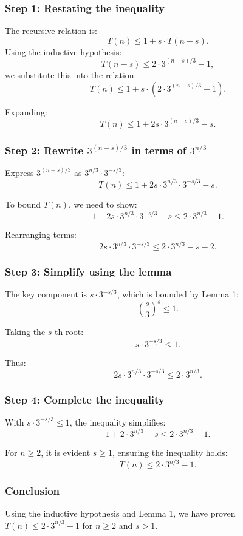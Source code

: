\documentclass[12pt]{article}
\begin{document}
\subsubsection*{Step 1: Restating the inequality}
The recursive relation is:
\[
T(n) \leq 1 + s \cdot T(n-s).
\]
Using the inductive hypothesis:
\[
T(n-s) \leq 2 \cdot 3^{(n-s)/3} - 1,
\]
we substitute this into the relation:
\[
T(n) \leq 1 + s \cdot (2 \cdot 3^{(n-s)/3} - 1).
\]

Expanding:
\[
T(n) \leq 1 + 2s \cdot 3^{(n-s)/3} - s.
\]

\subsubsection*{Step 2: Rewrite \( 3^{(n-s)/3} \) in terms of \( 3^{n/3} \)}
Express \( 3^{(n-s)/3} \) as \( 3^{n/3} \cdot 3^{-s/3} \):
\[
T(n) \leq 1 + 2s \cdot 3^{n/3} \cdot 3^{-s/3} - s.
\]

To bound \( T(n) \), we need to show:
\[
1 + 2s \cdot 3^{n/3} \cdot 3^{-s/3} - s \leq 2 \cdot 3^{n/3} - 1.
\]

Rearranging terms:
\[
2s \cdot 3^{n/3} \cdot 3^{-s/3} \leq 2 \cdot 3^{n/3} - s - 2.
\]

\subsubsection*{Step 3: Simplify using the lemma}
The key component is \( s \cdot 3^{-s/3} \), which is bounded by Lemma 1:
\[
\left( \frac{s}{3} \right)^s \leq 1.
\]

Taking the \( s \)-th root:
\[
s \cdot 3^{-s/3} \leq 1.
\]

Thus:
\[
2s \cdot 3^{n/3} \cdot 3^{-s/3} \leq 2 \cdot 3^{n/3}.
\]

\subsubsection*{Step 4: Complete the inequality}
With \( s \cdot 3^{-s/3} \leq 1 \), the inequality simplifies:
\[
1 + 2 \cdot 3^{n/3} - s \leq 2 \cdot 3^{n/3} - 1.
\]

For \( n \geq 2 \), it is evident \( s \geq 1 \), ensuring the inequality holds:
\[
T(n) \leq 2 \cdot 3^{n/3} - 1.
\]

\subsubsection*{Conclusion}
Using the inductive hypothesis and Lemma 1, we have proven \( T(n) \leq 2 \cdot 3^{n/3} - 1 \) for \( n \geq 2 \) and \( s > 1 \).
\
\end{document}
